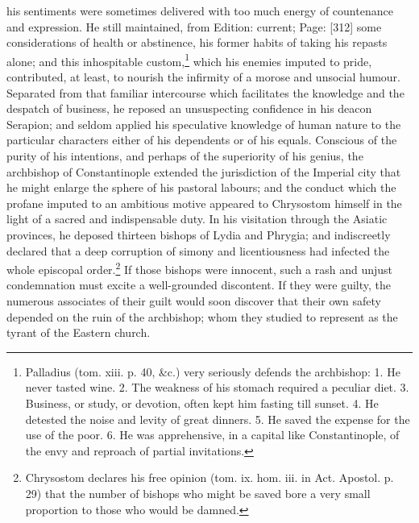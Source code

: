 his sentiments were sometimes delivered with too much energy of countenance and expression. He still maintained, from Edition: current; Page: [312] some considerations of health or abstinence, his former habits of taking his repasts alone; and this inhospitable custom,\footnote{Palladius (tom. xiii. p. 40, \&c.) very seriously defends the archbishop: 1. He never tasted wine. 2. The weakness of his stomach required a peculiar diet. 3. Business, or study, or devotion, often kept him fasting till sunset. 4. He detested the noise and levity of great dinners. 5. He saved the expense for the use of the poor. 6. He was apprehensive, in a capital like Constantinople, of the envy and reproach of partial invitations.} which his enemies imputed to pride, contributed, at least, to nourish the infirmity of a morose and unsocial humour. Separated from that familiar intercourse which facilitates the knowledge and the despatch of business, he reposed an unsuspecting confidence in his deacon Serapion; and seldom applied his speculative knowledge of human nature to the particular characters either of his dependents or of his equals. Conscious of the purity of his intentions, and perhaps of the superiority of his genius, the archbishop of Constantinople extended the jurisdiction of the Imperial city that he might enlarge the sphere of his pastoral labours; and the conduct which the profane imputed to an ambitious motive appeared to Chrysostom himself in the light of a sacred and indispensable duty. In his visitation through the Asiatic provinces, he deposed thirteen bishops of Lydia and Phrygia; and indiscreetly declared that a deep corruption of simony and licentiousness had infected the whole episcopal order.\footnote{Chrysostom declares his free opinion (tom. ix. hom. iii. in Act. Apostol. p. 29) that the number of bishops who might be saved bore a very small proportion to those who would be damned.} If those bishops were innocent, such a rash and unjust condemnation must excite a well-grounded discontent. If they were guilty, the numerous associates of their guilt would soon discover that their own safety depended on the ruin of the archbishop; whom they studied to represent as the tyrant of the Eastern church.

